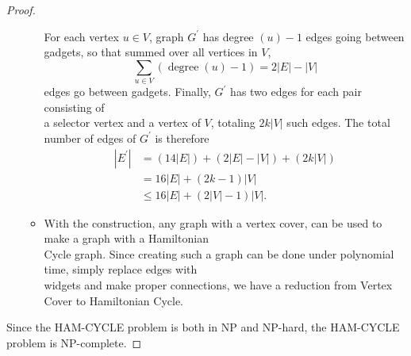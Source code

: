 \documentclass{article}
\begin{document}
\begin{proof}
\begin{itemize}
\begin{itemize}
            For each vertex $u \in V$, graph $G^{\prime}$ has degree $(u)-1$ edges going between gadgets, so that summed over all vertices in $V$,\\
            $$
            \sum_{u \in V}(\operatorname{degree}(u)-1)=2|E|-|V|
            $$
            edges go between gadgets. Finally, $G^{\prime}$ has two edges for each pair consisting of \\
            a selector vertex and a vertex of $V$, totaling $2 k|V|$ such edges. The total number of edges of $G^{\prime}$ is therefore \\
            $$
            \begin{aligned}
            \left|E^{\prime}\right| & =(14|E|)+(2|E|-|V|)+(2 k|V|) \\
            & =16|E|+(2 k-1)|V| \\
            & \leq 16|E|+(2|V|-1)|V| .
            \end{aligned}
            $$
            \item With the construction, any graph with a vertex cover, can be used to make a graph with a Hamiltonian \\
            Cycle graph. Since creating such a graph can be done under polynomial time, simply replace edges with \\
            widgets and make proper connections, we have a reduction from Vertex Cover to Hamiltonian Cycle. \\
        \end{itemize}
    \end{itemize}
    
    Since the HAM-CYCLE problem is both in NP and NP-hard, the HAM-CYCLE problem is NP-complete.

\end{proof}
\end{document}
